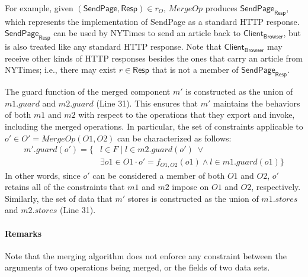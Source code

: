 For example, given $(\textsf{SendPage}, \textsf{Resp}) \in r_{O}$,
$MergeOp$ produces $\textsf{SendPage}_{\textsf{Resp}}$, which
represents the implementation of \textsf{SendPage} as a standard HTTP
response.  $\textsf{SendPage}_{\textsf{Resp}}$ can be used by
\textsf{NYTimes} to send an article back to
$\textsf{Client}_\textsf{Browser}$, but is also treated like any
standard HTTP response. Note that $\textsf{Client}_\textsf{Browser}$
may receive other kinds of HTTP responses besides the ones that carry
an article from \textsf{NYTimes}; i.e., there may exist $r \in
\textsf{Resp}$ that is not a member of $\textsf{SendPage}_{\textsf{Resp}}$.

The guard function of the merged component $m'$ is constructed
as the union of $m1.guard$ and $m2.guard$ (Line 31). This ensures that $m'$
maintains the behaviors of both $m1$ and $m2$ with respect to the
operations that they export and invoke, including the merged
operations. In particular, the set of constraints applicable to $o' \in O' =
MergeOp(O1, O2)$ can be characterized as follows:
\begin{align*}
m'.guard(o') = \{& l \in F \;|\; l \in m2.guard(o') \; \lor \\
&\exists o1 \in O1 
\cdot o' = f_{O1, O2}(o1) \land l \in m1.guard(o1) \} 
\end{align*}
In other words, since $o'$ can be considered a member of both $O1$ and
$O2$, $o'$ retains all of the constraints that $m1$ and $m2$ impose
on $O1$ and $O2$, respectively. Similarly, the set of data that $m'$
stores is constructed as the union of $m1.stores$ and $m2.stores$ (Line 31).



\paragraph{\textbf{Remarks}} Note that the merging algorithm
does not enforce any constraint between the arguments of two
operations being merged, or the fields of two data sets. 

